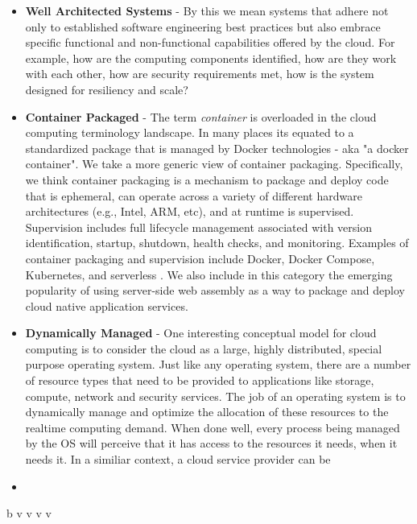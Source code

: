 \documentclass[conference]{IEEEconf}
\begin{document}
\begin{itemize}
	\item \textbf{Well Architected Systems} - By this we mean systems that adhere not only to established software engineering best practices but also embrace specific functional and non-functional capabilities offered by the cloud. For example, how are the computing components identified, how are they work with each other, how are security requirements met, how is the system designed for resiliency and scale?
	
	\item  \textbf{Container Packaged} - The term \textit{container} is overloaded in the cloud computing terminology landscape.  In many places its equated to a standardized package that is managed by Docker\cite{DockerContainer} technologies - aka "a docker container".  We take a more generic view of container packaging. Specifically, we think container packaging is a mechanism to package and deploy code that is ephemeral, can operate across a variety of different hardware architectures (e.g., Intel, ARM, etc), and at runtime is supervised.  Supervision includes full lifecycle management associated with version identification, startup, shutdown, health checks, and monitoring.  Examples of container packaging and supervision include Docker, Docker Compose, Kubernetes, and serverless \cite{baldini2017serverless}. We also include in this category the emerging popularity of using server-side web assembly\cite{haas2017bringing, bosshard2020use} as a way to package and deploy cloud native application services. 

	\item \textbf{Dynamically Managed} - One interesting conceptual model for cloud computing is to consider the cloud as a large, highly distributed, special purpose operating system. Just like any operating system, there are a number of resource types that need to be provided to applications like storage, compute, network and security services.  The job of an operating system is to dynamically manage and optimize the allocation of these resources to the realtime computing demand.  When done well, every process being managed by the OS will perceive that it has access to the resources it needs, when it needs it.  In a similiar context, a cloud service provider can be 
	
	
	\item 
	 
\end{itemize} 


b
v
v
v
v
\end{document}
